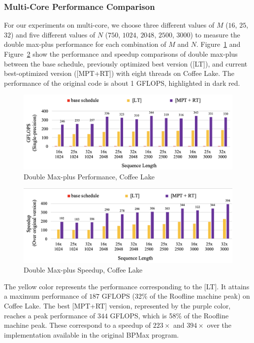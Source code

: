 \subsubsection{Multi-Core Performance Comparison}
For our experiments on multi-core, we choose three different values of $M$ ($16$, $25$, $32$) and five different values of $N$ ($750$, $1024$, $2048$, $2500$, $3000$) to measure the double max-plus performance for each combination of $M$ and $N$. Figure~\ref{fig:peroformance_analysis_double_max_plus} and Figure~\ref{fig:double_max_plus_speed_up} show the performance and speedup comparisons of double max-plus between the base schedule, previously optimized best version ([LT]), and current best-optimized version ([MPT+RT]) with eight threads on Coffee Lake. The performance of the original code is about 1 GFLOPS, highlighted in dark red.
\begin{figure}[htbp]
\centerline{\includegraphics[scale=0.42, trim=5 5 5 5,clip]{content/figures/dpm_performance_new.png}}
\caption{Double Max-plus Performance, Coffee Lake }
\label{fig:peroformance_analysis_double_max_plus}
\end{figure}
\begin{figure}[htbp]
\centerline{\includegraphics[scale=0.42, trim=5 5 5 5,clip]{content/figures/dpm_speedup_new.png}}
\caption{Double Max-plus Speedup, Coffee Lake}
\label{fig:double_max_plus_speed_up}
\end{figure}
The yellow color represents the performance corresponding to the [LT]. It attains a maximum performance of $187$ GFLOPS (32\% of the Roofline machine peak) on Coffee Lake. The best [MPT+RT] version, represented by the purple color, reaches a peak performance of $344$ GFLOPS, which is 58\% of the Roofline machine peak. These correspond to a speedup of $223\times$ and $394\times$  over the implementation available in the original BPMax program.




